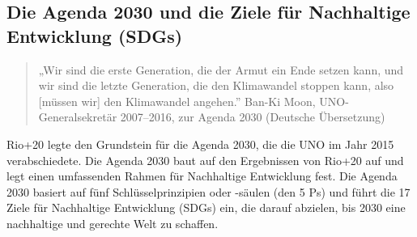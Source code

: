 \documentclass[
  nswissgerman,
  a4paper,
  DIV=11,
  numbers=noendperiod,
  oneside,
  openany]{scrreprt}
\begin{document}
\subsection{Die Agenda 2030 und die Ziele für Nachhaltige Entwicklung
(SDGs)}\label{die-agenda-2030-und-die-ziele-fuxfcr-nachhaltige-entwicklung-sdgs}

\begin{quote}
„Wir sind die erste Generation, die der Armut ein Ende setzen kann, und
wir sind die letzte Generation, die den Klimawandel stoppen kann, also
{[}müssen wir{]} den Klimawandel angehen.'' Ban-Ki Moon,
UNO-Generalsekretär 2007--2016, zur Agenda 2030 (Deutsche Übersetzung)
\end{quote}

Rio+20 legte den Grundstein für die Agenda 2030, die die UNO im Jahr
2015 verabschiedete. Die Agenda 2030 baut auf den Ergebnissen von Rio+20
auf und legt einen umfassenden Rahmen für Nachhaltige Entwicklung fest.
Die Agenda 2030 basiert auf fünf Schlüsselprinzipien oder -säulen (den 5
Ps) und führt die 17 Ziele für Nachhaltige Entwicklung (SDGs) ein, die
darauf abzielen, bis 2030 eine nachhaltige und gerechte Welt zu
schaffen.
\end{document}
